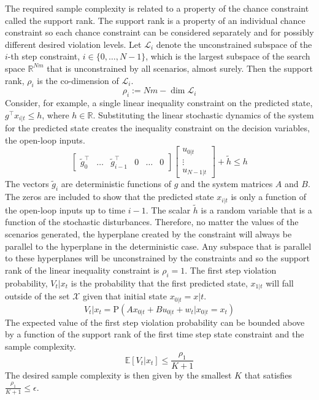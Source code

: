\documentclass[12 pt]{report}
\begin{document}
The required sample complexity is related to a property of the chance constraint called the support rank. The support rank is a property of an individual chance constraint so each chance constraint can be considered separately and for possibly different desired violation levels. Let $\mathcal{L}_i$ denote the unconstrained subspace of the $i$-th step constraint, $i \in \{0,\dots,N-1\}$, which is the largest subspace of the search space $\mathbb{R}^{Nm}$ that is unconstrained by all scenarios, almost surely. Then the support rank, $\rho_i$ is the co-dimension of $\mathcal{L}_i$. $$ \rho_i := Nm - \dim \mathcal{L}_i$$
Consider, for example, a single linear inequality constraint on the predicted state, $ g^\top x_{i|t} \leq h$, where $h \in \mathbb{R}$. Substituting the linear stochastic dynamics of the system for the predicted state creates the inequality constraint on the decision variables, the open-loop inputs.
\begin{displaymath}
\begin{bmatrix}
\tilde{g}_{0}^\top & \dots & \tilde{g}_{i-1}^\top & 0 & \dots & 0 
\end{bmatrix}
\begin{bmatrix}
u_{0|t} \\ \vdots \\ u_{N-1|t}
\end{bmatrix} + \tilde{h} \leq h
\end{displaymath}
The vectors $\tilde{g}_i$ are deterministic functions of $g$ and the system matrices $A$ and $B$. The zeros are included to show that the predicted state $x_{i|t}$ is only a function of the open-loop inputs up to time $i-1$. The scalar $\tilde{h}$ is a random variable that is a function of the stochastic disturbances. Therefore, no matter the values of the scenarios generated, the hyperplane created by the constraint will always be parallel to the hyperplane in the deterministic case. Any subspace that is parallel to these hyperplanes will be unconstrained by the constraints and so the support rank of the linear inequality constraint is $\rho_i = 1$.
The first step violation probability, $V_t|x_t$ is the probability that the first predicted state, $x_{1|t}$ will fall outside of the set $\mathcal{X}$ given that initial state $x_{0|t} = x|t$. $$V_t|x_t = \mathrm{P}\left( Ax_{0|t} + Bu_{0|t} + w_{t} | x_{0|t} = x_t \right) $$
The expected value of the first step violation probability can be bounded above by a function of the support rank of the first time step state constraint and the sample complexity. $$ \mathbb{E} \left[ V_t|x_t \right] \leq \frac{\rho_1}{K+1} $$
The desired sample complexity is then given by the smallest $K$ that satisfies $ \frac{\rho_1}{K+1} \leq \epsilon $.
\end{document}
